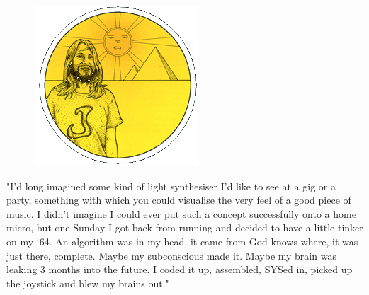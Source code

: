 \begin{definition}
\setlength{\intextsep}{0pt}%
\setlength{\columnsep}{3pt}%
\begin{figure}
\includegraphics[width=\linewidth]{src/callout/psych.png} 
\end{figure}
\small
"I'd long
imagined some kind of light synthesiser I'd like to see at a gig or a party,
something with which you could visualise the very feel of a good piece of
music. I didn't imagine I could ever put such a concept successfully onto a
home micro, but one Sunday I got back from running and decided to have a
little tinker on my ‘64. An algorithm was in my head, it came from God
knows where, it was just there, complete. Maybe my subconscious made it.
Maybe my brain was leaking 3 months into the future. I coded it up,
assembled, SYSed in, picked up the joystick and blew my brains out."
\end{definition}

